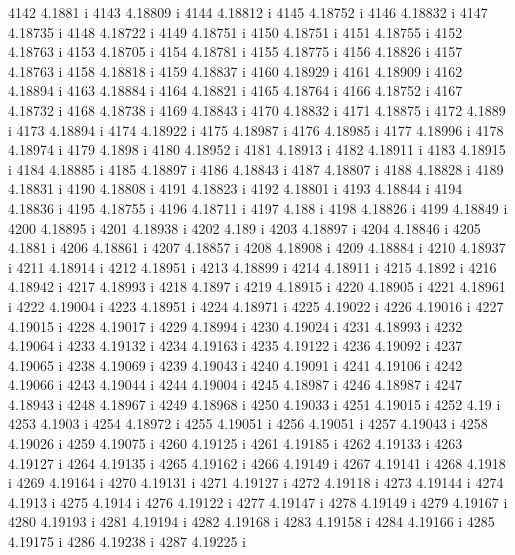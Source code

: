  4142  4.1881  i
 4143  4.18809  i
 4144  4.18812  i
 4145  4.18752  i
 4146  4.18832  i
 4147  4.18735  i
 4148  4.18722  i
 4149  4.18751  i
 4150  4.18751  i
 4151  4.18755  i
 4152  4.18763  i
 4153  4.18705  i
 4154  4.18781  i
 4155  4.18775  i
 4156  4.18826  i
 4157  4.18763  i
 4158  4.18818  i
 4159  4.18837  i
 4160  4.18929  i
 4161  4.18909  i
 4162  4.18894  i
 4163  4.18884  i
 4164  4.18821  i
 4165  4.18764  i
 4166  4.18752  i
 4167  4.18732  i
 4168  4.18738  i
 4169  4.18843  i
 4170  4.18832  i
 4171  4.18875  i
 4172  4.1889  i
 4173  4.18894  i
 4174  4.18922  i
 4175  4.18987  i
 4176  4.18985  i
 4177  4.18996  i
 4178  4.18974  i
 4179  4.1898  i
 4180  4.18952  i
 4181  4.18913  i
 4182  4.18911  i
 4183  4.18915  i
 4184  4.18885  i
 4185  4.18897  i
 4186  4.18843  i
 4187  4.18807  i
 4188  4.18828  i
 4189  4.18831  i
 4190  4.18808  i
 4191  4.18823  i
 4192  4.18801  i
 4193  4.18844  i
 4194  4.18836  i
 4195  4.18755  i
 4196  4.18711  i
 4197  4.188  i
 4198  4.18826  i
 4199  4.18849  i
 4200  4.18895  i
 4201  4.18938  i
 4202  4.189  i
 4203  4.18897  i
 4204  4.18846  i
 4205  4.1881  i
 4206  4.18861  i
 4207  4.18857  i
 4208  4.18908  i
 4209  4.18884  i
 4210  4.18937  i
 4211  4.18914  i
 4212  4.18951  i
 4213  4.18899  i
 4214  4.18911  i
 4215  4.1892  i
 4216  4.18942  i
 4217  4.18993  i
 4218  4.1897  i
 4219  4.18915  i
 4220  4.18905  i
 4221  4.18961  i
 4222  4.19004  i
 4223  4.18951  i
 4224  4.18971  i
 4225  4.19022  i
 4226  4.19016  i
 4227  4.19015  i
 4228  4.19017  i
 4229  4.18994  i
 4230  4.19024  i
 4231  4.18993  i
 4232  4.19064  i
 4233  4.19132  i
 4234  4.19163  i
 4235  4.19122  i
 4236  4.19092  i
 4237  4.19065  i
 4238  4.19069  i
 4239  4.19043  i
 4240  4.19091  i
 4241  4.19106  i
 4242  4.19066  i
 4243  4.19044  i
 4244  4.19004  i
 4245  4.18987  i
 4246  4.18987  i
 4247  4.18943  i
 4248  4.18967  i
 4249  4.18968  i
 4250  4.19033  i
 4251  4.19015  i
 4252  4.19  i
 4253  4.1903  i
 4254  4.18972  i
 4255  4.19051  i
 4256  4.19051  i
 4257  4.19043  i
 4258  4.19026  i
 4259  4.19075  i
 4260  4.19125  i
 4261  4.19185  i
 4262  4.19133  i
 4263  4.19127  i
 4264  4.19135  i
 4265  4.19162  i
 4266  4.19149  i
 4267  4.19141  i
 4268  4.1918  i
 4269  4.19164  i
 4270  4.19131  i
 4271  4.19127  i
 4272  4.19118  i
 4273  4.19144  i
 4274  4.1913  i
 4275  4.1914  i
 4276  4.19122  i
 4277  4.19147  i
 4278  4.19149  i
 4279  4.19167  i
 4280  4.19193  i
 4281  4.19194  i
 4282  4.19168  i
 4283  4.19158  i
 4284  4.19166  i
 4285  4.19175  i
 4286  4.19238  i
 4287  4.19225  i
